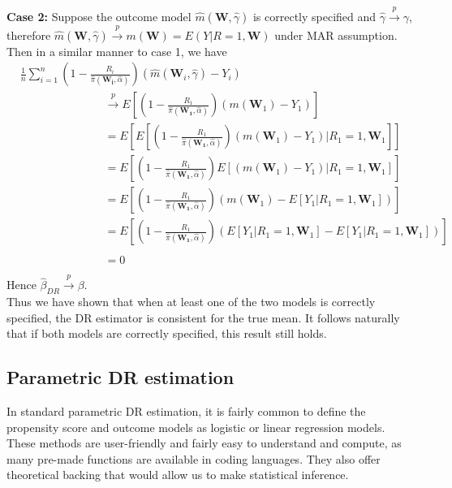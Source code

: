 \documentclass[12pt,twoside]{article}
\begin{document}
\textbf{Case 2:} Suppose the outcome model $\hat m(\mathbf{W}, \hat\gamma)$ is correctly specified and $\hat{\gamma} \xrightarrow{p} \gamma$, therefore  $\hat m(\mathbf{W}, \hat\gamma) \xrightarrow{p} m(\mathbf{W}) = E(Y|R = 1,\mathbf{W})$ under MAR assumption. Then in a similar manner to case 1, we have
\begin{align*}
& \frac{1}{n}\sum_{i=1}^{n}\left(1 - \frac{R_i}{\hat\pi(\mathbf{W_i},\hat{\alpha})} \right) (\hat m(\mathbf{W}_i, \hat\gamma)-Y_i) \\
     & \phantom{E [(1 - \frac{R_1}{\pi(\mathbf{W_1})})} \xrightarrow{p} E\left[\left(1 - \frac{R_1}{\hat\pi(\mathbf{W_1},\hat{\alpha})} \right) (m(\mathbf{W}_1)-Y_1)\right]  \\
     & \phantom{E [(1 - \frac{R_1}{\pi(\mathbf{W_1})})} = E\left[ E\left[\left(1 - \frac{R_1}{\hat\pi(\mathbf{W_1},\hat{\alpha})} \right)(m(\mathbf{W}_1)-Y_1)|R_1 = 1, \mathbf{W}_1\right]\right] \\
     & \phantom{E [(1 - \frac{R_1}{\pi(\mathbf{W_1})})} = E\left[\left(1 - \frac{R_1}{\hat\pi(\mathbf{W_1},\hat{\alpha})} \right) E\left[(m(\mathbf{W}_1)-Y_1)|R_1 = 1, \mathbf{W}_1\right]\right] \\
     & \phantom{E [(1 - \frac{R_1}{\pi(\mathbf{W_1})})} = E\left[\left(1 - \frac{R_1}{\hat\pi(\mathbf{W_1},\hat{\alpha})} \right) (m(\mathbf{W}_1)-E\left[Y_1|R_1 = 1, \mathbf{W}_1\right])\right] \\
     & \phantom{E [(1 - \frac{R_1}{\pi(\mathbf{W_1})})} = E\left[\left(1 - \frac{R_1}{\hat\pi(\mathbf{W_1},\hat{\alpha})} \right) (E\left[Y_1|R_1=1, \mathbf{W}_1\right]-E\left[Y_1|R_1=1, \mathbf{W}_1\right])\right] \\
     & \phantom{E [(1 - \frac{R_1}{\pi(\mathbf{W_1})})} = 0
\end{align*}
Hence $\hat{\beta}_{DR} \xrightarrow{p} \beta$.\\

Thus we have shown that when at least one of the two models is correctly specified, the DR estimator is consistent for the true mean. It follows naturally that if both models are correctly specified, this result still holds.

\subsection{Parametric DR estimation}

In standard parametric DR estimation, it is fairly common to define the propensity score and outcome models as logistic or linear regression models. These methods are user-friendly and fairly easy to understand and compute, as many pre-made functions are available in coding languages. They also offer theoretical backing that would allow us to make statistical inference.\\
\end{document}
